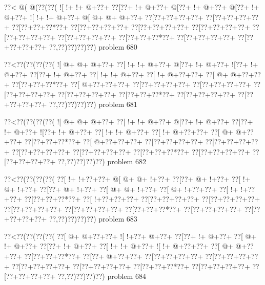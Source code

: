 \vbox{\vbox{\goo
\0??<\- @(\- @(\0??(\0??(
\- ![\- !+\- !+\- @+\0??+
\0??[\0??+\- !+\- @+\0??+
\- @[\0??+\- !+\- @+\0??+
\- @[\0??+\- !+\- @+\0??+
\- ![\- !+\- !+\- @+\0??+
\- @[\- @+\- @+\- @+\0??+
\0??[\0??+\0??+\0??+\0??+
\0??[\0??+\0??+\0??+\0??+
\0??[\0??+\0??+\0??*\0??+
\0??[\0??+\0??+\0??+\0??+
\0??[\0??+\0??+\0??+\0??+
\0??[\0??+\0??+\0??+\0??+
\0??[\0??+\0??+\0??+\0??+
\0??[\0??+\0??+\0??+\0??+
\0??[\0??+\0??+\0??*\0??+
\0??[\0??+\0??+\0??+\0??+
\0??[\0??+\0??+\0??+\0??+
\0??,\0??)\0??)\0??)\0??)
}
\hfil problem 680\hfil\break
}

\vbox{\vbox{\goo
\0??<\0??(\0??(\0??(\0??(
\- ![\- @+\- @+\- @+\0??+
\0??[\- !+\- !+\- @+\0??+
\- @[\0??+\- !+\- @+\0??+
\- ![\0??+\- !+\- @+\0??+
\0??[\0??+\- !+\- @+\0??+
\0??[\- !+\- !+\- @+\0??+
\0??[\- !+\- @+\0??+\0??+
\0??[\- @+\- @+\0??+\0??+
\0??[\0??+\0??+\0??*\0??+
\0??[\- @+\0??+\0??+\0??+
\0??[\0??+\0??+\0??+\0??+
\0??[\0??+\0??+\0??+\0??+
\0??[\0??+\0??+\0??+\0??+
\0??[\0??+\0??+\0??+\0??+
\0??[\0??+\0??+\0??*\0??+
\0??[\0??+\0??+\0??+\0??+
\0??[\0??+\0??+\0??+\0??+
\0??,\0??)\0??)\0??)\0??)
}
\hfil problem 681\hfil\break
}

\vbox{\vbox{\goo
\0??<\0??(\0??(\0??(\0??(
\- ![\- @+\- @+\- @+\0??+
\0??[\- !+\- !+\- @+\0??+
\- @[\0??+\- !+\- @+\0??+
\0??[\0??+\- !+\- @+\0??+
\- ![\0??+\- !+\- @+\0??+
\0??[\- !+\- !+\- @+\0??+
\0??[\- !+\- @+\0??+\0??+
\0??[\- @+\- @+\0??+\0??+
\0??[\0??+\0??+\0??*\0??+
\0??[\- @+\0??+\0??+\0??+
\0??[\0??+\0??+\0??+\0??+
\0??[\0??+\0??+\0??+\0??+
\0??[\0??+\0??+\0??+\0??+
\0??[\0??+\0??+\0??+\0??+
\0??[\0??+\0??+\0??*\0??+
\0??[\0??+\0??+\0??+\0??+
\0??[\0??+\0??+\0??+\0??+
\0??,\0??)\0??)\0??)\0??)
}
\hfil problem 682\hfil\break
}

\vbox{\vbox{\goo
\0??<\0??(\0??(\0??(\0??(
\0??[\- !+\- !+\0??+\0??+
\- @[\- @+\- @+\- !+\0??+
\0??[\0??+\- @+\- !+\0??+
\0??[\- !+\- @+\- !+\0??+
\0??[\0??+\- @+\- !+\0??+
\0??[\- @+\- @+\- !+\0??+
\0??[\- @+\- !+\0??+\0??+
\0??[\- !+\- !+\0??+\0??+
\0??[\0??+\0??+\0??*\0??+
\0??[\- !+\0??+\0??+\0??+
\0??[\0??+\0??+\0??+\0??+
\0??[\0??+\0??+\0??+\0??+
\0??[\0??+\0??+\0??+\0??+
\0??[\0??+\0??+\0??+\0??+
\0??[\0??+\0??+\0??*\0??+
\0??[\0??+\0??+\0??+\0??+
\0??[\0??+\0??+\0??+\0??+
\0??,\0??)\0??)\0??)\0??)
}
\hfil problem 683\hfil\break
}

\vbox{\vbox{\goo
\0??<\0??(\0??(\0??(\0??(
\0??[\- @+\- @+\0??+\0??+
\- ![\- !+\0??+\- @+\0??+
\0??[\0??+\- !+\- @+\0??+
\0??[\- @+\- !+\- @+\0??+
\0??[\0??+\- !+\- @+\0??+
\0??[\- !+\- !+\- @+\0??+
\- ![\- !+\- @+\0??+\0??+
\0??[\- @+\- @+\0??+\0??+
\0??[\0??+\0??+\0??*\0??+
\0??[\0??+\- @+\0??+\0??+
\0??[\0??+\0??+\0??+\0??+
\0??[\0??+\0??+\0??+\0??+
\0??[\0??+\0??+\0??+\0??+
\0??[\0??+\0??+\0??+\0??+
\0??[\0??+\0??+\0??*\0??+
\0??[\0??+\0??+\0??+\0??+
\0??[\0??+\0??+\0??+\0??+
\0??,\0??)\0??)\0??)\0??)
}
\hfil problem 684\hfil\break
}

